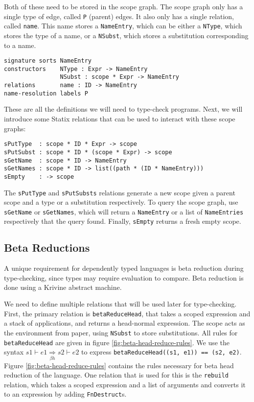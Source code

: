 \documentclass[a4paper,UKenglish,cleveref, autoref, thm-restate]{oasics-v2021}
\newcommand{\bhr}{\underset{\beta h}{\Rightarrow}}
\begin{document}
Both of these need to be stored in the scope graph. The scope graph only has a single type of edge, called \verb|P| (parent) edges. It also only has a single relation, called \verb|name|. This name stores a \verb|NameEntry|, which can be either a \verb|NType|, which stores the type of a name, or a \verb|NSubst|, which stores a substitution corresponding to a name. 

\begin{lstlisting}
signature sorts	NameEntry
constructors    NType : Expr -> NameEntry
                NSubst : scope * Expr -> NameEntry
relations       name : ID -> NameEntry
name-resolution	labels P
\end{lstlisting}

These are all the definitions we will need to type-check programs. Next, we will introduce some Statix relations that can be used to interact with these scope graphs:

\begin{lstlisting}
sPutType  : scope * ID * Expr -> scope
sPutSubst : scope * ID * (scope * Expr) -> scope
sGetName  : scope * ID -> NameEntry
sGetNames : scope * ID -> list((path * (ID * NameEntry)))
sEmpty    : -> scope
\end{lstlisting}

The \verb|sPutType| and \verb|sPutSubsts| relations generate a new scope given a parent scope and a type or a substitution respectively. To query the scope graph, use \verb|sGetName| or \verb|sGetNames|, which will return a \verb|NameEntry| or a list of \verb|NameEntries| respectively that the query found. Finally, \verb|sEmpty| returns a fresh empty scope.

\subsection{Beta Reductions}

A unique requirement for dependently typed languages is beta reduction during type-checking, since types may require evaluation to compare. Beta reduction is done using a Krivine abstract machine\cite{krivine}. 

We need to define multiple relations that will be used later for type-checking. First, the primary relation is \verb|betaReduceHead|, that takes a scoped expression and a stack of applications, and returns a head-normal expression. The scope acts as the environment from \cite{krivine} paper, using \verb|NSubst| to store substitutions. All rules for \verb|betaReduceHead| are given in figure \ref{fig:beta-head-reduce-rules}. We use the syntax $s1 \vdash e1 \bhr s2 \vdash e2$ to express \verb|betaReduceHead((s1, e1)) == (s2, e2)|. Figure \ref{fig:beta-head-reduce-rules} contains the rules necessary for beta head reduction of the language. One relation that is used for this is the \verb|rebuild| relation, which takes a scoped expression and a list of arguments and converts it to an expression by adding \verb|FnDestruct|s.
\end{document}
